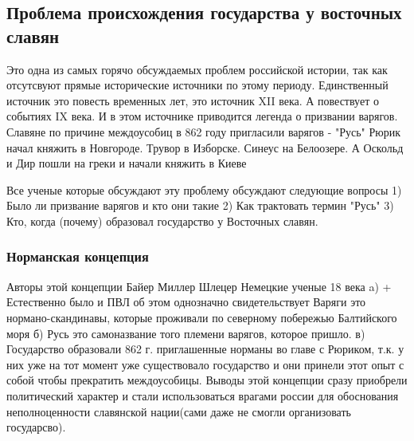 \documentclass[a4paper]{article}
\begin{document}
\subsection{Проблема происхождения государства у восточных славян}
Это одна из самых горячо обсуждаемых проблем российской истории, так как отсутсвуют прямые исторические источники по этому периоду.
Единственный источник это повесть временных лет, это источник XII века. А повествует о событиях IX века. И в этом источнике приводится легенда о призвании варягов.
Славяне по причине междоусобиц в 862 году пригласили варягов - "Русь" 
Рюрик начал княжить в Новгороде. Трувор в Изборске. Синеус на Белоозере.
А Оскольд и Дир пошли на греки и начали княжить в Киеве

Все ученые которые обсуждают эту проблему обсуждают следующие вопросы
1) Было ли призвание варягов и кто они такие
2) Как трактовать термин "Русь"
3) Кто, когда (почему) образовал государство у Восточных славян. 

\subsubsection{Норманская концепция}
Авторы этой концепции 
Байер
Миллер 
Шлецер
Немецкие ученые 18 века
a) + Естественно было и ПВЛ об этом однозначно свидетельствует
Варяги это нормано-скандинавы, которые проживали по северному побережью Балтийского моря
б) Русь это самоназвание того племени варягов, которое пришло. 
в) Государство образовали 862 г. приглашенные норманы во главе с Рюриком, т.к. у них уже на тот момент уже существовало государство и они принели этот опыт с собой чтобы прекратить междоусобицы.
Выводы этой концепции сразу приобрели политический характер и стали использоваться врагами россии для обоснования неполноценности славянской нации(сами даже не смогли организовать государсво).
\end{document}
